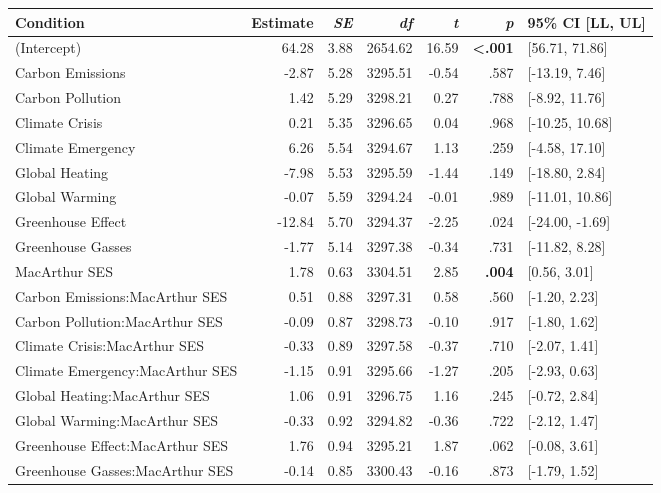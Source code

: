 \begin{table}[ht]
\centering
\begin{tabular}{lrrrrrl}
  \hline
Condition & Estimate & \textit{SE} & \textit{df} & \textit{t} & \textit{p} & 95\% CI [LL, UL] \\ 
  \hline
(Intercept) & 64.28 & 3.88 & 2654.62 & 16.59 & \textbf{\textless  .001} & [56.71, 71.86] \\ 
  Carbon Emissions & -2.87 & 5.28 & 3295.51 & -0.54 & .587 & [-13.19, 7.46] \\ 
  Carbon Pollution & 1.42 & 5.29 & 3298.21 & 0.27 & .788 & [-8.92, 11.76] \\ 
  Climate Crisis & 0.21 & 5.35 & 3296.65 & 0.04 & .968 & [-10.25, 10.68] \\ 
  Climate Emergency & 6.26 & 5.54 & 3294.67 & 1.13 & .259 & [-4.58, 17.10] \\ 
  Global Heating & -7.98 & 5.53 & 3295.59 & -1.44 & .149 & [-18.80, 2.84] \\ 
  Global Warming & -0.07 & 5.59 & 3294.24 & -0.01 & .989 & [-11.01, 10.86] \\ 
  Greenhouse Effect & -12.84 & 5.70 & 3294.37 & -2.25 & .024 & [-24.00, -1.69] \\ 
  Greenhouse Gasses & -1.77 & 5.14 & 3297.38 & -0.34 & .731 & [-11.82, 8.28] \\ 
  MacArthur SES & 1.78 & 0.63 & 3304.51 & 2.85 & \textbf{.004} & [0.56, 3.01] \\ 
  Carbon Emissions:MacArthur SES & 0.51 & 0.88 & 3297.31 & 0.58 & .560 & [-1.20, 2.23] \\ 
  Carbon Pollution:MacArthur SES & -0.09 & 0.87 & 3298.73 & -0.10 & .917 & [-1.80, 1.62] \\ 
  Climate Crisis:MacArthur SES & -0.33 & 0.89 & 3297.58 & -0.37 & .710 & [-2.07, 1.41] \\ 
  Climate Emergency:MacArthur SES & -1.15 & 0.91 & 3295.66 & -1.27 & .205 & [-2.93, 0.63] \\ 
  Global Heating:MacArthur SES & 1.06 & 0.91 & 3296.75 & 1.16 & .245 & [-0.72, 2.84] \\ 
  Global Warming:MacArthur SES & -0.33 & 0.92 & 3294.82 & -0.36 & .722 & [-2.12, 1.47] \\ 
  Greenhouse Effect:MacArthur SES & 1.76 & 0.94 & 3295.21 & 1.87 & .062 & [-0.08, 3.61] \\ 
  Greenhouse Gasses:MacArthur SES & -0.14 & 0.85 & 3300.43 & -0.16 & .873 & [-1.79, 1.52] \\ 
   \hline
\end{tabular}
\end{table}
